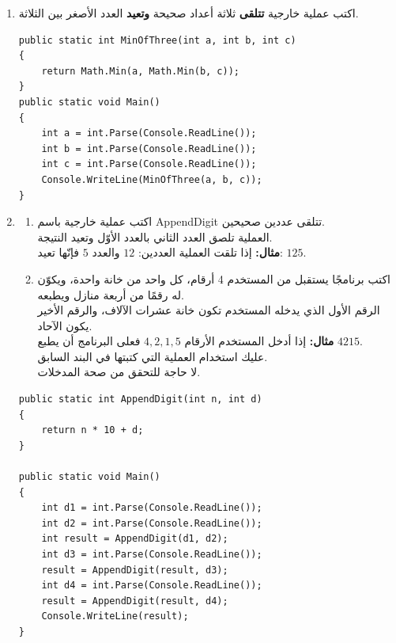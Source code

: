 ﻿\documentclass[12pt]{article}
\begin{document}
\begin{enumerate}[itemsep=3em]
\begin{enumerate}
\item اكتب عملية خارجية \textbf{تتلقى} ثلاثة أعداد صحيحة \textbf{وتعيد} العدد الأصغر بين الثلاثة.
\ifwithsols
\begin{boxSolution}
\begin{english}
\begin{verbatim}
public static int MinOfThree(int a, int b, int c)
{
    return Math.Min(a, Math.Min(b, c));
}
public static void Main()
{
    int a = int.Parse(Console.ReadLine());
    int b = int.Parse(Console.ReadLine());
    int c = int.Parse(Console.ReadLine());
    Console.WriteLine(MinOfThree(a, b, c));
}
\end{verbatim}
\end{english}
\end{boxSolution}
\fi



\clearpage

\item
\begin{enumerate}
    \item اكتب عملية خارجية باسم \textenglish{AppendDigit} تتلقى عددين صحيحين. \\
    العملية تلصق العدد الثاني بالعدد الأوّل وتعيد النتيجة. \\
    \textbf{مثال:} إذا تلقت العملية العددين: $12$ والعدد $5$ فإنّها تعيد: $125$.
    \item اكتب برنامجًا يستقبل من المستخدم 4 أرقام، كل واحد من خانة واحدة، ويكوّن له رقمًا من أربعة منازل ويطبعه. \\
    الرقم الأول الذي يدخله المستخدم تكون خانة عشرات الآلاف، والرقم الأخير يكون الآحاد. \\
    \textbf{مثال:} إذا أدخل المستخدم الأرقام $4,2,1,5$ فعلى البرنامج أن يطبع $4215$. \\
    عليك استخدام العملية التي كتبتها في البند السابق. \\
    لا حاجة للتحقق من صحة المدخلات.
\end{enumerate}
    \ifwithsols
\begin{boxSolution}
\begin{english}
\begin{verbatim}
public static int AppendDigit(int n, int d)
{
    return n * 10 + d;
}

public static void Main()
{
    int d1 = int.Parse(Console.ReadLine());
    int d2 = int.Parse(Console.ReadLine());
    int result = AppendDigit(d1, d2);
    int d3 = int.Parse(Console.ReadLine());
    result = AppendDigit(result, d3);
    int d4 = int.Parse(Console.ReadLine());
    result = AppendDigit(result, d4);
    Console.WriteLine(result);
}
\end{verbatim}
\end{english}
\end{boxSolution}
\fi



\end{enumerate}
\end{enumerate}
\end{document}
